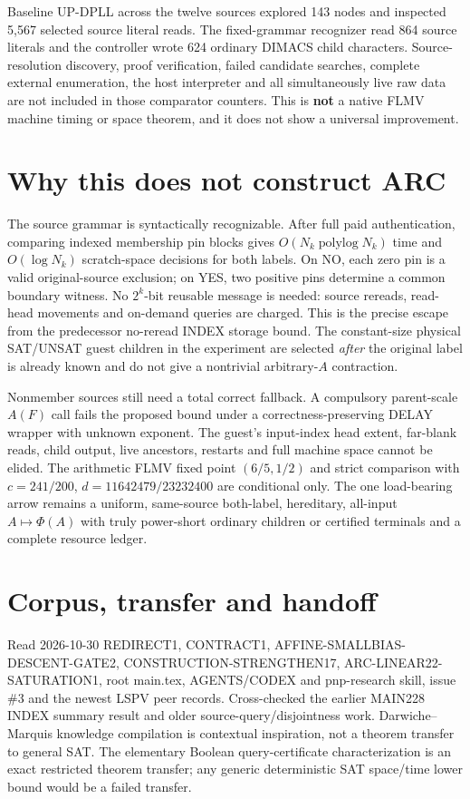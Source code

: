 \documentclass[11pt]{article}
\begin{document}
Baseline UP-DPLL across the twelve sources explored 143 nodes and inspected 5,567 selected source literal reads. The fixed-grammar recognizer read 864 source literals and the controller wrote 624 ordinary DIMACS child characters. Source-resolution discovery, proof verification, failed candidate searches, complete external enumeration, the host interpreter and all simultaneously live raw data are not included in those comparator counters. This is \textbf{not} a native FLMV machine timing or space theorem, and it does not show a universal improvement.

\section{Why this does not construct ARC}
The source grammar is syntactically recognizable. After full paid authentication, comparing indexed membership pin blocks gives $O(N_k\operatorname{polylog}N_k)$ time and $O(\log N_k)$ scratch-space decisions for both labels. On NO, each zero pin is a valid original-source exclusion; on YES, two positive pins determine a common boundary witness. No $2^k$-bit reusable message is needed: source rereads, read-head movements and on-demand queries are charged. This is the precise escape from the predecessor no-reread INDEX storage bound. The constant-size physical SAT/UNSAT guest children in the experiment are selected \emph{after} the original label is already known and do not give a nontrivial arbitrary-$A$ contraction.

Nonmember sources still need a total correct fallback. A compulsory parent-scale $A(F)$ call fails the proposed bound under a correctness-preserving DELAY wrapper with unknown exponent. The guest's input-index head extent, far-blank reads, child output, live ancestors, restarts and full machine space cannot be elided. The arithmetic FLMV fixed point $(6/5,1/2)$ and strict comparison with $c=241/200$, $d=11642479/23232400$ are conditional only. The one load-bearing arrow remains a uniform, same-source both-label, hereditary, all-input $A\mapsto\Phi(A)$ with truly power-short ordinary children or certified terminals and a complete resource ledger.

\section{Corpus, transfer and handoff}
Read 2026-10-30 REDIRECT1, CONTRACT1, AFFINE-SMALLBIAS-DESCENT-GATE2, CONSTRUCTION-STRENGTHEN17, ARC-LINEAR22-SATURATION1, root main.tex, AGENTS/CODEX and pnp-research skill, issue \#3 and the newest LSPV peer records. Cross-checked the earlier MAIN228 INDEX summary result and older source-query/disjointness work. Darwiche--Marquis knowledge compilation is contextual inspiration, not a theorem transfer to general SAT. The elementary Boolean query-certificate characterization is an exact restricted theorem transfer; any generic deterministic SAT space/time lower bound would be a failed transfer.
\end{document}
